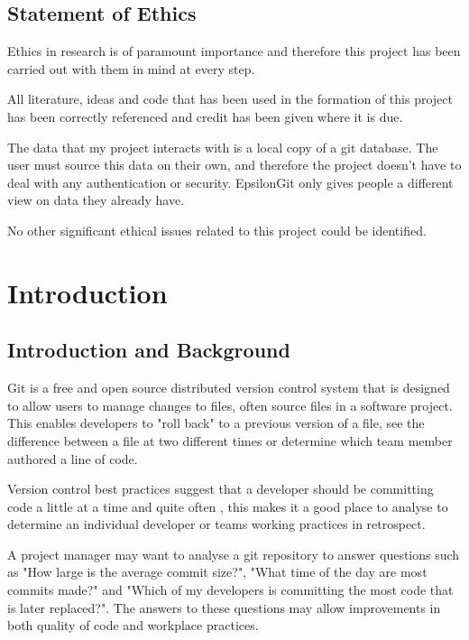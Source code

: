 \documentclass[11pt]{book}
\begin{document}
\section*{Statement of Ethics}
Ethics in research is of paramount importance and therefore this project has been carried out with them in mind at every step. 

All literature, ideas and code that has been used in the formation of this project has been correctly referenced and credit has been given where it is due.

The data that my project interacts with is a local copy of a git database. The user must source this data on their own, and therefore the project doesn't have to deal with any authentication or security. EpsilonGit only gives people a different view on data they already have.

No other significant ethical issues related to this project could be identified.

\tableofcontents

\chapter{Introduction}
\label{introandbackground}
\section{Introduction and Background}
	
Git is a free and open source distributed version control system \cite{gitintro} that is designed to allow users to manage changes to files, often source files in a software project. This enables developers to "roll back" to a previous version of a file, see the difference between a file at two different times or determine which team member authored a line of code. 

Version control best practices suggest that a developer should be committing code a little at a time and quite often \cite{gitbestpractices}, this makes it a good place to analyse to determine an individual developer or teams working practices in retrospect.

A project manager may want to analyse a git repository to answer questions such as "How large is the average commit size?", "What time of the day are most commits made?" and "Which of my developers is committing the most code that is later replaced?". The answers to these questions may allow improvements in both quality of code and workplace practices.
\end{document}
